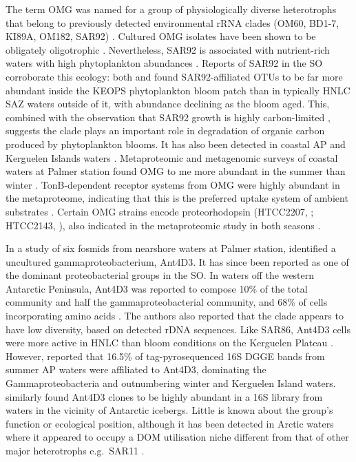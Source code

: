 
The term \ac{OMG} was named for a group of physiologically diverse heterotrophs that belong to previously detected environmental rRNA clades (OM60, BD1-7, KI89A, OM182, SAR92) \cite{Cho:2004gm}.
Cultured \ac{OMG} isolates have been shown to be obligately oligotrophic \cite{Cho:2004gm}.
Nevertheless, SAR92 is associated with nutrient-rich waters with high phytoplankton abundances \cite{Stingl:2007ja,Pinhassi:2004is}.
Reports of SAR92 in the \ac{SO} corroborate this ecology: both \citet{West:2008kc} and \citet{Obernosterer:2011df} found SAR92-affiliated \acp{OTU} to be far more abundant inside the \ac{KEOPS} phytoplankton bloom patch than in typically \ac{HNLC} \ac{SAZ} waters outside of it, with abundance declining as the bloom aged.
This, combined with the observation that SAR92 growth is highly carbon-limited \cite{Stingl:2007ja}, suggests the clade plays an important role in degradation of organic carbon produced by phytoplankton blooms.
It has also been detected in coastal \ac{AP} and Kerguelen Islands waters \cite{Ghiglione:2011ee}.
Metaproteomic and metagenomic surveys of coastal waters at Palmer station found \ac{OMG} to me more abundant in the summer than winter \cite{Williams:2012bs}.
TonB-dependent receptor systems from \ac{OMG} were highly abundant in the metaproteome, indicating that this is the preferred uptake system of ambient substrates \cite{Williams:2012bs}.
Certain \ac{OMG} strains encode proteorhodopsin (HTCC2207, \citet{Stingl:2007ja}; HTCC2143, \citet{Oh:2010di}), also indicated in the metaproteomic study in both seasons \cite{Williams:2012bs}.


In a study of six fosmids from nearshore waters at Palmer station, \cite{Grzymski:2006ds} identified a uncultured gammaproteobacterium, Ant4D3.
It has since been reported as one of the dominant proteobacterial groups in the \ac{SO}.
In waters off the western Antarctic Peninsula, Ant4D3 was reported to compose 10\% of the total community and half the gammaproteobacterial community, and 68\% of cells incorporating amino acids \cite{Straza:2010io}.
The authors also reported that the clade appears to have low diversity, based on detected rDNA sequences.
Like SAR86, Ant4D3 cells were more active in \ac{HNLC} than bloom conditions on the Kerguelen Plateau \cite{West:2008kc}.
However, \cite{Ghiglione:2011ee} reported that 16.5\% of tag-pyrosequenced 16S \ac{DGGE} bands from summer \ac{AP} waters were affiliated to Ant4D3, dominating the Gammaproteobacteria and outnumbering winter and Kerguelen Island waters.
\cite{Murray:2011ib} similarly found Ant4D3 clones to be highly abundant in a 16S library from waters in the vicinity of Antarctic icebergs.
Little is known about the group's function or ecological position, although it has been detected in Arctic waters where it appeared to occupy a \ac{DOM} utilisation niche different from that of other major heterotrophs e.g.\ SAR11 \cite{Nikrad:2012fa}.

